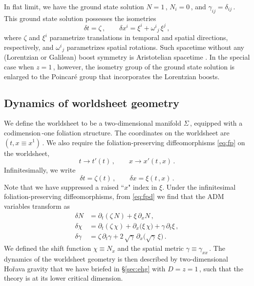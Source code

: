 \documentclass[11pt]{article}
\newcommand{\be}{\begin{equation}}
\newcommand{\ee}{\end{equation}}
\newcommand{\lr}{\left (}
\newcommand{\rr}{\right )}
\newcommand{\p}{\partial}
\begin{document}
In flat limit, we have the ground state solution $N = 1$\,, $N_i = 0$\,, and $\gamma_{ij} = \delta_{ij}$\,. This ground state solution possesses the isometries
%
\be \label{eq:iso}
	\delta t = \zeta\,,
		\qquad
	\delta x^i = \xi^i + \omega^i{}_j \, \xi^j\,,
\ee
%
where $\zeta$ and $\xi^i$ parametrize translations in temporal and spatial directions, respectively, and $\omega^i{}_j$ parametrizes spatial rotations. Such spacetime without any (Lorentzian or Galilean) boost symmetry is Aristotelian spacetime \cite{Penrose:1968ar, Grosvenor:2016gmj}. In the special case when $z=1$\,, however, the isometry group of the ground state solution is enlarged to the Poincar\'{e} group that incorporates the Lorentzian boosts. 

\subsection{Dynamics of worldsheet geometry} \label{sec:dwg}

We define the worldsheet to be a two-dimensional manifold $\Sigma$\,, equipped with a codimension\,\!-one foliation structure. The coordinates on the worldsheet are $(t, x \equiv x^1)$\,. We also require the foliation-preserving diffeomorphisms \eqref{eq:fp} on the worldsheet, 
%
\be \label{eq:fpx}
	t \rightarrow t' (t)\,,
		\qquad
	x \rightarrow x' (t\,, x)\,.
\ee
%
Infinitesimally, we write
%
\be \label{eq:fpxinf}
	\delta t = \zeta (t)\,,
		\qquad
	\delta x = \xi (t\,, x)\,.
\ee
%
Note that we have suppressed a raised ``$x$" index in $\xi$. Under the infinitesimal foliation-preserving diffeomorphisms, from \eqref{eq:fpd} we find that the ADM variables transform as
%
\begin{subequations} \label{eq:fpdx}
\begin{align}
	\delta N & = \p^{}_t \! \lr \zeta \, N \rr + \xi \, \p_{x} N\,, \\[2pt]
	\delta \chi & = \p^{}_t \! \lr \zeta \, \chi \rr + \p_{x} \bigl(  \xi \, \chi \bigr) + \gamma \, \p_t \xi\,, \label{eq:fpdNx} \\[2pt]
	\delta \gamma & = \zeta \, \p^{}_t \gamma + 2 \, \sqrt{\gamma} \, \p_x \bigl( \sqrt{\gamma} \, \xi \bigr) \,.
\end{align}
\end{subequations}
%
We defined the shift function $\chi \equiv N_x$ and the spatial metric $\gamma \equiv \gamma_{xx}$\,.
The dynamics of the worldsheet geometry is then described by two-dimensional Ho\v{r}ava gravity that we have briefed in \S\ref{sec:ehg} with $D = z = 1$\,, such that the theory is at its lower critical dimension. 
\end{document}
